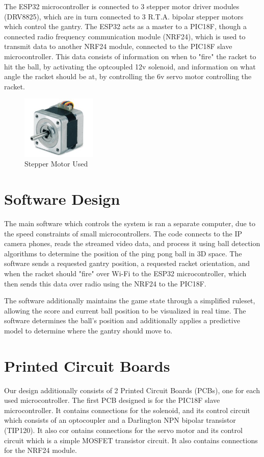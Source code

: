 The ESP32 microcontroller is connected to 3 stepper motor driver modules (DRV8825), which are in turn connected to 3 R.T.A. bipolar stepper motors which control the gantry. The ESP32 acts as a master to a PIC18F, though a connected radio frequency communication module (NRF24), which is used to transmit data to another NRF24 module, connected to the PIC18F slave microcontroller. This data consists of information on when to "fire" the racket to hit the ball, by activating the optcoupled 12v solenoid, and information on what angle the racket should be at, by controlling the 6v servo motor controlling the racket.

\begin{figure}[h]
	\centering\includegraphics[height=3cm]{./images/steppermotor}
	\caption{Stepper Motor Used}
\end{figure}

\section{Software Design}
The main software which controls the system is ran a separate computer, due to the speed constraints of small microcontrollers. The code connects to the IP camera phones, reads the streamed video data, and process it using ball detection algorithms to determine the position of the ping pong ball in 3D space. The software sends a requested gantry position, a requested racket orientation, and when the racket should "fire" over Wi-Fi to the ESP32 microcontroller, which then sends this data over radio using the NRF24 to the PIC18F.

The software additionally maintains the game state through a simplified ruleset, allowing the score and current ball position to be visualized in real time. The software determines the ball's position and additionally applies a predictive model to determine where the gantry should move to.


\section{Printed Circuit Boards}

Our design additionally consists of 2 Printed Circuit Boards (PCBs), one for each used microcontroller. The first PCB designed is for the PIC18F slave microcontroller. It contains connections for the solenoid, and its control circuit which consists of an optocoupler and a Darlington NPN bipolar transistor (TIP120). It also cor ontains connections for the servo motor and its control circuit which is a simple MOSFET transistor circuit. It also contains connections for the NRF24 module.

